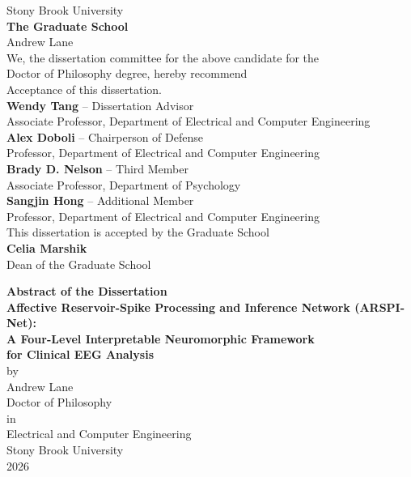 \documentclass[12pt]{report}
\theoremstyle{definition}
\theoremstyle{remark}
\begin{document}
\clearpage
{}
\setcounter{page}{2}
\thispagestyle{plain}
\begin{center}
{\large Stony Brook University}\\[0.15cm]
{\large \textbf{The Graduate School}}\\[1.1cm]
{\large Andrew Lane}\\[0.7cm]

We, the dissertation committee for the above candidate for the\\
Doctor of Philosophy degree, hereby recommend\\
Acceptance of this dissertation.\\[0.9cm]

{\large \textbf{Wendy Tang} -- Dissertation Advisor}\\
Associate Professor, Department of Electrical and Computer Engineering\\[0.65cm]

{\large \textbf{Alex Doboli} -- Chairperson of Defense}\\
Professor, Department of Electrical and Computer Engineering\\[0.65cm]

{\large \textbf{Brady D. Nelson} -- Third Member}\\
Associate Professor, Department of Psychology\\[0.65cm]

{\large \textbf{Sangjin Hong} -- Additional Member}\\
Professor, Department of Electrical and Computer Engineering\\[1.0cm]

This dissertation is accepted by the Graduate School\\[0.55cm]

{\large \textbf{Celia Marshik}}\\
Dean of the Graduate School
\end{center}

\clearpage
\begin{center}
{\large \textbf{Abstract of the Dissertation}}\\[0.6cm]
{\large \textbf{Affective Reservoir-Spike Processing and Inference Network (ARSPI-Net):}}\\[0.2cm]
{\large \textbf{A Four-Level Interpretable Neuromorphic Framework}}\\[0.2cm]
{\large \textbf{for Clinical EEG Analysis}}\\[0.6cm]
{\large by}\\[0.2cm]
{\large Andrew Lane}\\[0.4cm]
{\large Doctor of Philosophy}\\[0.1cm]
{\large in}\\[0.1cm]
{\large Electrical and Computer Engineering}\\[0.1cm]
{\large Stony Brook University}\\[0.1cm]
{\large 2026}
\end{center}
\end{document}
